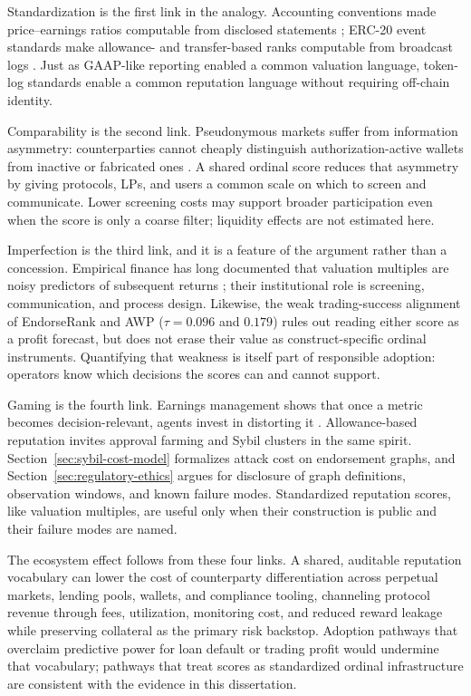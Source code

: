 Standardization is the first link in the analogy. Accounting conventions made price--earnings ratios computable from disclosed statements ; ERC-20 event standards make allowance- and transfer-based ranks computable from broadcast logs . Just as GAAP-like reporting enabled a common valuation language, token-log standards enable a common reputation language without requiring off-chain identity.

Comparability is the second link. Pseudonymous markets suffer from information asymmetry: counterparties cannot cheaply distinguish authorization-active wallets from inactive or fabricated ones . A shared ordinal score reduces that asymmetry by giving protocols, LPs, and users a common scale on which to screen and communicate. Lower screening costs may support broader participation even when the score is only a coarse filter; liquidity effects are not estimated here.

Imperfection is the third link, and it is a feature of the argument rather than a concession. Empirical finance has long documented that valuation multiples are noisy predictors of subsequent returns ; their institutional role is screening, communication, and process design. Likewise, the weak trading-success alignment of EndorseRank and AWP ($\tau=0.096$ and $0.179$) rules out reading either score as a profit forecast, but does not erase their value as construct-specific ordinal instruments. Quantifying that weakness is itself part of responsible adoption: operators know which decisions the scores can and cannot support.

Gaming is the fourth link. Earnings management shows that once a metric becomes decision-relevant, agents invest in distorting it . Allowance-based reputation invites approval farming and Sybil clusters in the same spirit. Section~\ref{sec:sybil-cost-model} formalizes attack cost on endorsement graphs, and Section~\ref{sec:regulatory-ethics} argues for disclosure of graph definitions, observation windows, and known failure modes. Standardized reputation scores, like valuation multiples, are useful only when their construction is public and their failure modes are named.

The ecosystem effect follows from these four links. A shared, auditable reputation vocabulary can lower the cost of counterparty differentiation across perpetual markets, lending pools, wallets, and compliance tooling, channeling protocol revenue through fees, utilization, monitoring cost, and reduced reward leakage while preserving collateral as the primary risk backstop. Adoption pathways that overclaim predictive power for loan default or trading profit would undermine that vocabulary; pathways that treat scores as standardized ordinal infrastructure are consistent with the evidence in this dissertation.

